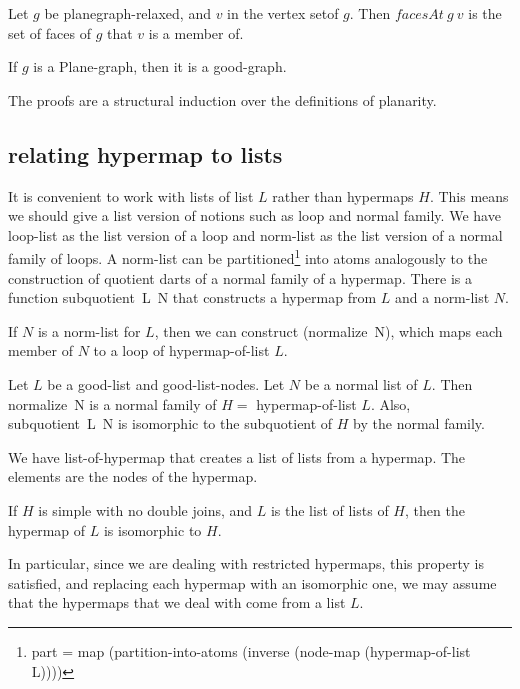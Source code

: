 \begin{lemma}
Let $g$ be planegraph-relaxed, and $v$ in the vertex setof $g$.
Then $facesAt~g~v$ is the set of faces of $g$ that $v$ is a member of.
\end{lemma}

\begin{lemma}
If $g$ is a Plane-graph, then it is a good-graph.
\end{lemma}

The proofs are a structural induction over the definitions of planarity.

\subsection{relating hypermap to lists}

It is convenient to work with lists of list $L$ rather than hypermaps $H$.  This means
we should give a list version of notions such as loop and normal family.
We have loop-list as the list version of a loop and norm-list as the list
version of  a normal family of loops.  A norm-list can be partitioned\footnote{ 
part = map (partition-into-atoms (inverse (node-map (hypermap-of-list L))))} into
atoms analogously to the construction of quotient darts of a normal family of a hypermap.
There is a function subquotient~L~N that constructs a hypermap from $L$ and a norm-list $N$.

If $N$ is a norm-list for $L$, then we can construct (normalize~N), which maps each member of $N$
to a loop of hypermap-of-list $L$.

\begin{lemma}\guid{} Let $L$ be a good-list and good-list-nodes.  Let $N$ be a normal list of $L$.
Then normalize~N is a normal family of $H= $ hypermap-of-list $L$.  Also, subquotient~L~N is isomorphic
to the subquotient of $H$ by the normal family.
\end{lemma}

We have list-of-hypermap that creates a list of lists from a hypermap.
The elements are the nodes of the hypermap.

\begin{lemma}\guid{}  If $H$ is simple with no double joins, and $L$ is the
list of lists of $H$, then the hypermap of $L$ is isomorphic to $H$.
\end{lemma}

In particular, since we are dealing with restricted hypermaps, this property is satisfied, and replacing each hypermap
with an isomorphic one,  we may
assume that the hypermaps that we deal with come from a list $L$.

